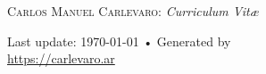 \documentclass[10pt, a4paper]{article}
\begin{document}
% 
\thispagestyle{empty}
{\Large \textsc{Carlos Manuel Carlevaro}: \textit{Curriculum Vit{\ae}}}

\hrulefill







\vspace{1cm}
\vfill{}
\begin{center}
{\scriptsize  Last update: \today\- •\- 
Generated by \href{http://es.wikipedia.org/wiki/XeTeX}{
\XeLaTeX}\\
\href{https://carlevaro.ar}{https://carlevaro.ar}}
\end{center}
\end{document}
